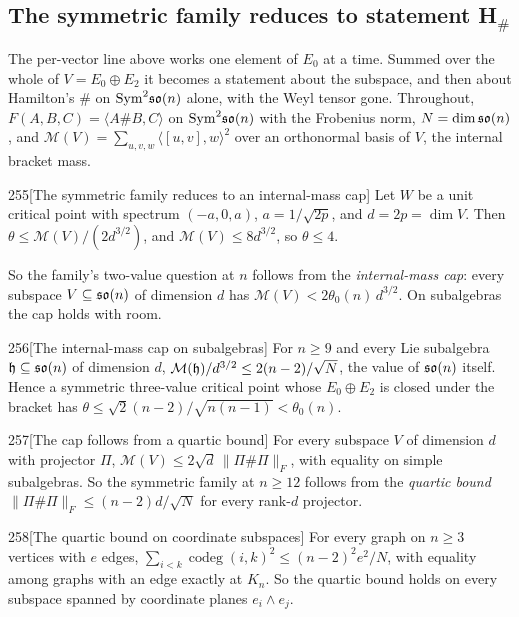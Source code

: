 \subsection{The symmetric family reduces to statement \texorpdfstring{H$_\#$}{H\#}}\label{sec:statementH}

The per-vector line above works one element of $E_0$ at a time. Summed over the whole of $V=E_0\oplus E_2$ it becomes a statement about the subspace, and then about Hamilton's $\#$ on $\mathrm{Sym}^2\mathfrak{so}(n)$ alone, with the Weyl tensor gone. Throughout, $F(A,B,C)=\langle A\#B,C\rangle$ on $\mathrm{Sym}^2\mathfrak{so}(n)$ with the Frobenius norm, $N=\dim\mathfrak{so}(n)$, and $\mathcal M(V)=\sum_{u,v,w}\langle[u,v],w\rangle^2$ over an orthonormal basis of $V$, the internal bracket mass.

\begin{Lem}{255}[The symmetric family reduces to an internal-mass cap]
Let $W$ be a unit critical point with spectrum $(-a,0,a)$, $a=1/\sqrt{2p}$, and $d=2p=\dim V$. Then $\theta\le\mathcal M(V)/(2d^{3/2})$, and $\mathcal M(V)\le8d^{3/2}$, so $\theta\le4$.
\end{Lem}

So the family's two-value question at $n$ follows from the \emph{internal-mass cap}: every subspace $V\subseteq\mathfrak{so}(n)$ of dimension $d$ has $\mathcal M(V)<2\theta_0(n)\,d^{3/2}$. On subalgebras the cap holds with room.

\begin{Lem}{256}[The internal-mass cap on subalgebras]
For $n\ge9$ and every Lie subalgebra $\mathfrak{h}\subseteq\mathfrak{so}(n)$ of dimension $d$, $\mathcal M(\mathfrak{h})/d^{3/2}\le2(n-2)/\sqrt N$, the value of $\mathfrak{so}(n)$ itself. Hence a symmetric three-value critical point whose $E_0\oplus E_2$ is closed under the bracket has $\theta\le\sqrt2(n-2)/\sqrt{n(n-1)}<\theta_0(n)$.
\end{Lem}

\begin{Lem}{257}[The cap follows from a quartic bound]
For every subspace $V$ of dimension $d$ with projector $\Pi$, $\mathcal M(V)\le2\sqrt d\,\lVert\Pi\#\Pi\rVert_F$, with equality on simple subalgebras. So the symmetric family at $n\ge12$ follows from the \emph{quartic bound} $\lVert\Pi\#\Pi\rVert_F\le(n-2)d/\sqrt N$ for every rank-$d$ projector.
\end{Lem}

\begin{Lem}{258}[The quartic bound on coordinate subspaces]
For every graph on $n\ge3$ vertices with $e$ edges, $\sum_{i<k}\operatorname{codeg}(i,k)^2\le(n-2)^2e^2/N$, with equality among graphs with an edge exactly at $K_n$. So the quartic bound holds on every subspace spanned by coordinate planes $e_i\wedge e_j$.
\end{Lem}

